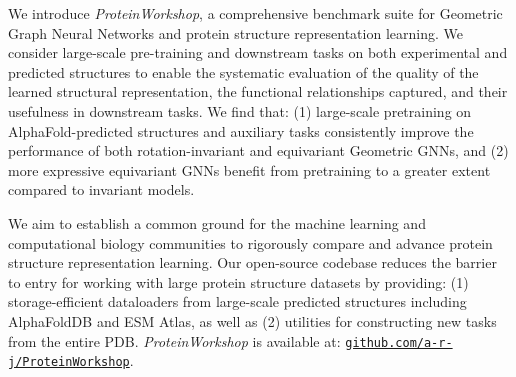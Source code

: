 We introduce \emph{ProteinWorkshop}, a comprehensive benchmark suite for Geometric Graph Neural Networks and protein structure representation learning.
We consider large-scale pre-training and downstream tasks on both experimental and predicted structures to enable the systematic evaluation of the quality of the learned structural representation, the functional relationships captured, and their usefulness in downstream tasks. 
We find that: (1) large-scale pretraining on AlphaFold-predicted structures and auxiliary tasks consistently improve the performance of both rotation-invariant and equivariant Geometric GNNs, and (2) more expressive equivariant GNNs benefit from pretraining to a greater extent compared to invariant models.

We aim to establish a common ground for the machine learning and computational biology communities to rigorously compare and advance protein structure representation learning. 
Our open-source codebase reduces the barrier to entry for working with large protein structure datasets by providing: (1) storage-efficient dataloaders from large-scale predicted structures including AlphaFoldDB and ESM Atlas, as well as (2) utilities for constructing new tasks from the entire PDB.
\emph{ProteinWorkshop} is available at: \href{https://github.com/a-r-j/ProteinWorkshop}{\texttt{github.com/a-r-j/ProteinWorkshop}}.

